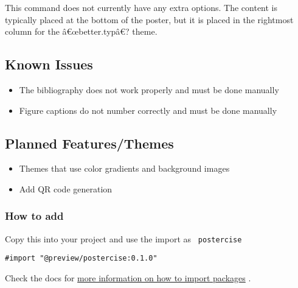 This command does not currently have any extra options. The content is
typically placed at the bottom of the poster, but it is placed in the
rightmost column for the â€œbetter.typâ€? theme.

\begin{Shaded}
\begin{Highlighting}[]
\NormalTok{\#poster{-}footer[}
\NormalTok{]}
\end{Highlighting}
\end{Shaded}

\subsection{Known Issues}\label{known-issues}

\begin{itemize}
\tightlist
\item
  The bibliography does not work properly and must be done manually
\item
  Figure captions do not number correctly and must be done manually
\end{itemize}

\subsection{Planned Features/Themes}\label{planned-featuresthemes}

\begin{itemize}
\tightlist
\item
  Themes that use color gradients and background images
\item
  Add QR code generation
\end{itemize}

\subsubsection{How to add}\label{how-to-add}

Copy this into your project and use the import as
\texttt{\ postercise\ }

\begin{verbatim}
#import "@preview/postercise:0.1.0"
\end{verbatim}



Check the docs for
\href{https://typst.app/docs/reference/scripting/\#packages}{more
information on how to import packages} .

